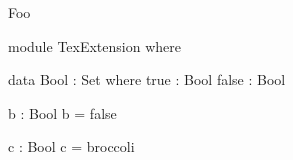 \documentclass{article}
\begin{document}
Foo

\begin{code}

module TexExtension where

  data Bool : Set where
    true : Bool
    false : Bool

  b : Bool
  b = false

\end{code}

  c : Bool
  c = broccoli
\end{document}
